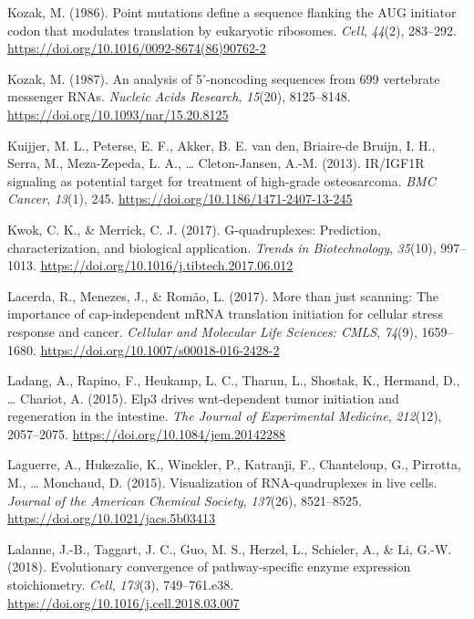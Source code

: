 \documentclass[12pt,openany]{book}
\begin{document}
\hypertarget{ref-Kozak1986}{}
Kozak, M. (1986). Point mutations define a sequence flanking the AUG
initiator codon that modulates translation by eukaryotic ribosomes.
\emph{Cell}, \emph{44}(2), 283--292.
\url{https://doi.org/10.1016/0092-8674(86)90762-2}

\hypertarget{ref-Kozak1987}{}
Kozak, M. (1987). An analysis of 5'-noncoding sequences from 699
vertebrate messenger RNAs. \emph{Nucleic Acids Research}, \emph{15}(20),
8125--8148. \url{https://doi.org/10.1093/nar/15.20.8125}

\hypertarget{ref-Kuijjer2013}{}
Kuijjer, M. L., Peterse, E. F., Akker, B. E. van den, Briaire-de Bruijn,
I. H., Serra, M., Meza-Zepeda, L. A., \ldots{} Cleton-Jansen, A.-M.
(2013). IR/IGF1R signaling as potential target for treatment of
high-grade osteosarcoma. \emph{BMC Cancer}, \emph{13}(1), 245.
\url{https://doi.org/10.1186/1471-2407-13-245}

\hypertarget{ref-Kwok2017}{}
Kwok, C. K., \& Merrick, C. J. (2017). G-quadruplexes: Prediction,
characterization, and biological application. \emph{Trends in
Biotechnology}, \emph{35}(10), 997--1013.
\url{https://doi.org/10.1016/j.tibtech.2017.06.012}

\hypertarget{ref-Lacerda2017}{}
Lacerda, R., Menezes, J., \& Romão, L. (2017). More than just scanning:
The importance of cap-independent mRNA translation initiation for
cellular stress response and cancer. \emph{Cellular and Molecular Life
Sciences: CMLS}, \emph{74}(9), 1659--1680.
\url{https://doi.org/10.1007/s00018-016-2428-2}

\hypertarget{ref-Ladang2015}{}
Ladang, A., Rapino, F., Heukamp, L. C., Tharun, L., Shostak, K.,
Hermand, D., \ldots{} Chariot, A. (2015). Elp3 drives wnt-dependent
tumor initiation and regeneration in the intestine. \emph{The Journal of
Experimental Medicine}, \emph{212}(12), 2057--2075.
\url{https://doi.org/10.1084/jem.20142288}

\hypertarget{ref-Laguerre2015}{}
Laguerre, A., Hukezalie, K., Winckler, P., Katranji, F., Chanteloup, G.,
Pirrotta, M., \ldots{} Monchaud, D. (2015). Visualization of
RNA-quadruplexes in live cells. \emph{Journal of the American Chemical
Society}, \emph{137}(26), 8521--8525.
\url{https://doi.org/10.1021/jacs.5b03413}

\hypertarget{ref-Lalanne2018}{}
Lalanne, J.-B., Taggart, J. C., Guo, M. S., Herzel, L., Schieler, A., \&
Li, G.-W. (2018). Evolutionary convergence of pathway-specific enzyme
expression stoichiometry. \emph{Cell}, \emph{173}(3), 749--761.e38.
\url{https://doi.org/10.1016/j.cell.2018.03.007}
\end{document}
